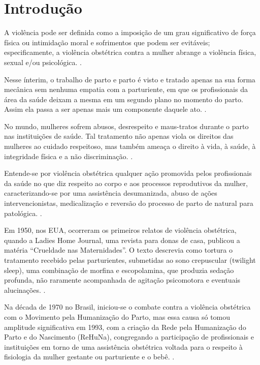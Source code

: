 \chapter{Introdução}
\label{cap:introducao}

A violência pode ser definida como a imposição de um grau significativo de força física ou intimidação moral e sofrimentos que podem ser evitáveis; especificamente, a violência obstétrica contra a mulher abrange a violência física, sexual e/ou psicológica. \cite{cardoso2017violencia}.

Nesse ínterim, o trabalho de parto e parto é visto e tratado apenas na sua forma mecânica sem nenhuma empatia com a parturiente, em que os profissionais da área da saúde deixam a mesma em um segundo plano no momento do parto. Assim ela passa a ser apenas mais um componente daquele ato. \cite{cardoso2017violencia}.

No mundo, mulheres sofrem abusos, desrespeito e maus-tratos durante o parto nas instituições de saúde. Tal tratamento não apenas viola os direitos das mulheres ao cuidado respeitoso, mas também ameaça o direito à vida, à saúde, à integridade física e a não discriminação. \cite{cardoso2017violencia}.

\begin{citacao}
Entende-se por violência obstétrica qualquer ação promovida pelos profissionais da saúde no que diz respeito ao corpo e aos processos reprodutivos da mulher, caracterizando-se por uma assistência desumanizada, abuso de ações intervencionistas, medicalização e reversão do processo de parto de natural para patológica. \cite[p.3347]{cardoso2017violencia}.
\end{citacao}

Em 1950, nos EUA, ocorreram os primeiros relatos de violência obstétrica, quando a Ladies Home Journal, uma revista para donas de casa, publicou a matéria ``Crueldade nas Maternidades''. O texto descrevia como tortura o tratamento recebido pelas parturientes, submetidas ao sono crepuscular (twilight sleep), uma combinação de morfina e escopolamina, que produzia sedação profunda, não raramente acompanhada de agitação psicomotora e eventuais alucinações. \cite{diniz2015abuse}.

Na década de 1970 no Brasil, iniciou-se o combate contra a violência obstétrica com o Movimento pela Humanização do Parto, mas essa causa só tomou amplitude significativa em 1993, com a criação da Rede pela Humanização do Parto e do Nascimento (\acrshort{ReHuNa}), congregando a participação de profissionais e instituições em torno de uma assistência obstétrica voltada para o respeito à fisiologia da mulher gestante ou parturiente e o bebê. \cite{soares2017violencia}.

